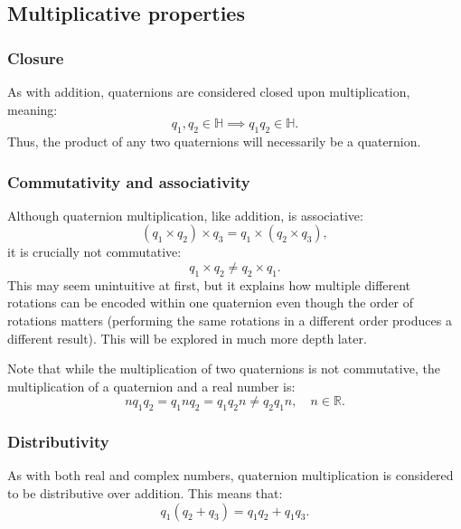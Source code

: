 \documentclass[12pt]{article}
\theoremstyle{definition}
\begin{document}
\subsection{Multiplicative properties}

\subsubsection{Closure}

As with addition, quaternions are considered closed upon multiplication, meaning:
\begin{equation}
    q_1, q_2 \in \mathbb{H} \implies q_1q_2 \in \mathbb{H}.
\end{equation}
Thus, the product of any two quaternions will necessarily be a quaternion. \cite{Illinois}

\subsubsection{Commutativity and associativity} \label{ComAss}

Although quaternion multiplication, like addition, is associative: \cite{Illinois}
\begin{equation}
    (q_1 \times q_2) \times q_3 = q_1 \times (q_2 \times q_3),
\end{equation}
it is crucially not commutative: \cite{Math431}
\begin{equation}
    q_1 \times q_2 \neq q_2 \times q_1.
\end{equation}
This may seem unintuitive at first, but it explains how multiple different rotations can be encoded within one quaternion even though the order of rotations matters (performing the same rotations in a different order produces a different result). \cite{Eater} This will be explored in much more depth later.

Note that while the multiplication of two quaternions is not commutative, the multiplication of a quaternion and a real number is:
\begin{equation}
    nq_1q_2 = q_1nq_2 = q_1q_2n \neq q_2q_1n, \quad n \in \mathbb{R}.
\end{equation}

\subsubsection{Distributivity}

As with both real and complex numbers, quaternion multiplication is considered to be distributive over addition. This means that:
\begin{equation}
    q_1(q_2 + q_3) = q_1q_2 + q_1q_3.
\end{equation}
\end{document}
